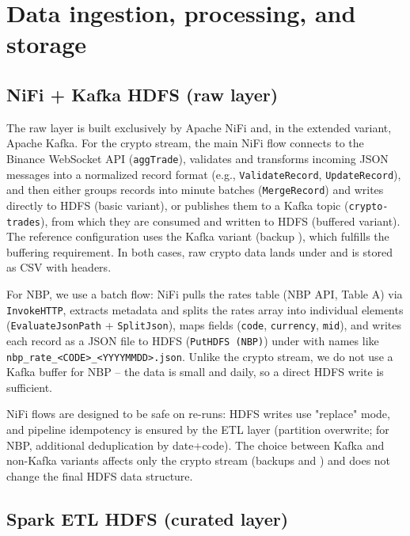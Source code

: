 \documentclass{article}
\begin{document}
\section{Data ingestion, processing, and storage}

\subsection{NiFi + Kafka \textrightarrow{} HDFS (raw layer)}

The raw layer is built exclusively by Apache NiFi and, in the extended
variant, Apache Kafka. For the crypto stream, the main NiFi flow connects
to the Binance WebSocket API (\texttt{aggTrade}), validates and
transforms incoming JSON messages into a normalized record format (e.g.,
\texttt{ValidateRecord}, \texttt{UpdateRecord}), and then either groups
records into minute batches (\texttt{MergeRecord}) and writes directly to
HDFS (basic variant), or publishes them to a Kafka topic
(\texttt{crypto-trades}), from which they are consumed and written to
HDFS (buffered variant). The reference configuration uses the Kafka
variant (backup ), which
fulfills the buffering requirement. In both cases, raw crypto data lands
under 
and is stored as CSV with headers.

For NBP, we use a batch flow: NiFi pulls the rates table (NBP API, Table
A) via \texttt{InvokeHTTP}, extracts metadata and splits the rates array
into individual elements (\texttt{EvaluateJsonPath} +
\texttt{SplitJson}), maps fields (\texttt{code}, \texttt{currency},
\texttt{mid}), and writes each record as a JSON file to HDFS
(\texttt{PutHDFS (NBP)}) under
 with names like
\texttt{nbp\_rate\_<CODE>\_<YYYYMMDD>.json}. Unlike the crypto stream, we
do not use a Kafka buffer for NBP -- the data is small and daily, so a
direct HDFS write is sufficient.

NiFi flows are designed to be safe on re-runs: HDFS writes use "replace"
mode, and pipeline idempotency is ensured by the ETL layer (partition
overwrite; for NBP, additional deduplication by date+code). The choice
between Kafka and non-Kafka variants affects only the crypto stream
(backups  and
) and does not change the
final HDFS data structure.

\subsection{Spark ETL \textrightarrow{} HDFS (curated layer)}
\end{document}
